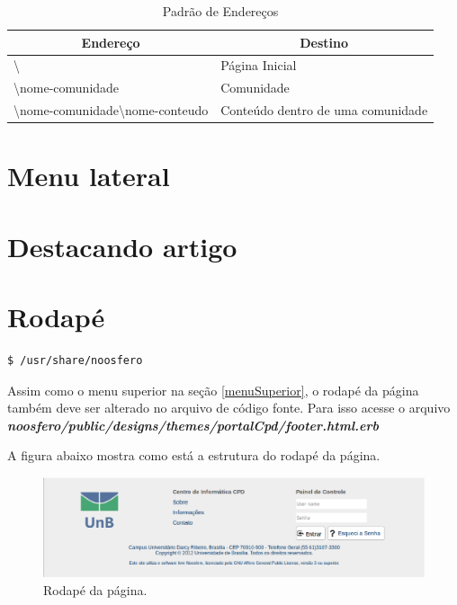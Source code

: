 \begin{table}[h]
\begin{tabular}{|l|l|}
  \hline
  \multicolumn{1}{|c|}{\textbf{Endereço}} & \multicolumn{1}{c|}{\textbf{Destino}} \\
  \hline
  \textbackslash & Página Inicial \\
  \textbackslash nome-comunidade & Comunidade \\
  \textbackslash nome-comunidade\textbackslash nome-conteudo & Conteúdo dentro de uma comunidade \\
  \hline
\end{tabular}
\caption {Padrão de Endereços}
\end{table}

\section{Menu lateral}

\section{Destacando artigo}

\section{Rodapé}

\begin{lstlisting}
$ /usr/share/noosfero
\end{lstlisting}

Assim como o menu superior na seção \ref{menuSuperior}, o rodapé da página também deve ser alterado no arquivo de código fonte. Para isso acesse o arquivo \textbf{\textit{noosfero/public/designs/themes/portalCpd/footer.html.erb}}

A figura abaixo mostra como está a estrutura do rodapé da página.
\begin{figure}[h]
     \centering
       \includegraphics[keepaspectratio=true,scale=0.49]{figuras/footer.eps}
     \caption{Rodapé da página.}
\end{figure}

